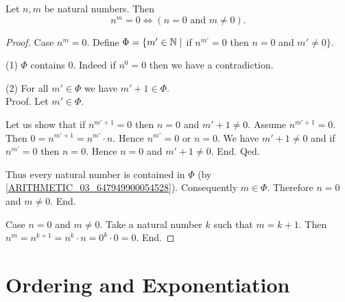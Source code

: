 \documentclass[10pt]{article}
\begin{document}
  \begin{forthel}
    \begin{proposition}
      Let $n, m$ be natural numbers.
      Then \[ n^{m} = 0 \iff (\text{$n = 0$ and $m \neq 0$}). \]
    \end{proposition}
    \begin{proof}
      Case $n^{m} = 0$.
        Define $\Phi = \{ m' \in \mathbb{N} \mid$ if $n^{m'} = 0$ then $n = 0$ and
        $m' \neq 0 \}$.

        (1) $\Phi$ contains $0$.
        Indeed if $n^{0} = 0$ then we have a contradiction.

        (2) For all $m' \in \Phi$ we have $m' + 1 \in \Phi$. \\
        Proof.
          Let $m' \in \Phi$.

          Let us show that if $n^{m' + 1} = 0$ then $n = 0$ and $m' + 1 \neq 0$.
            Assume $n^{m' + 1} = 0$.
            Then $0 = n^{m' + 1} = n^{m'} \cdot n$.
            Hence $n^{m'} = 0$ or $n = 0$.
            We have $m' + 1 \neq 0$ and if $n^{m'} = 0$ then $n = 0$.
            Hence $n = 0$ and $m' + 1 \neq 0$.
          End.
        Qed.

        Thus every natural number is contained in $\Phi$ (by \cref{ARITHMETIC_03_647949900054528}).
        Consequently $m \in \Phi$.
        Therefore $n = 0$ and $m \neq 0$.
      End.

      Case $n = 0$ and $m \neq 0$.
        Take a natural number $k$ such that $m = k + 1$.
        Then $n^{m}
          = n^{k + 1}
          = n^{k} \cdot n
          = 0^{k} \cdot 0
          = 0$.
      End.
    \end{proof}
  \end{forthel}


  \section{Ordering and Exponentiation}
\end{document}

